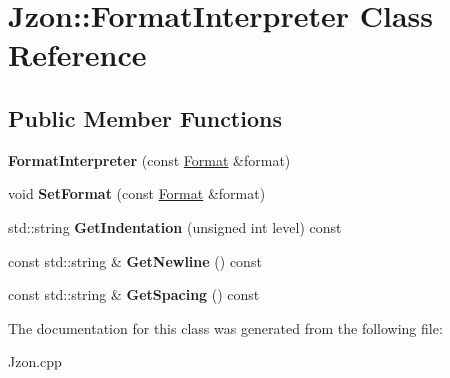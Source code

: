 \hypertarget{class_jzon_1_1_format_interpreter}{\section{Jzon\-:\-:Format\-Interpreter Class Reference}
\label{class_jzon_1_1_format_interpreter}
}
\subsection*{Public Member Functions}
\begin{DoxyCompactItemize}
\item 
\hypertarget{class_jzon_1_1_format_interpreter_a7464cb390be4ee67f45e9be26ef7ba08}{{\bfseries Format\-Interpreter} (const \hyperlink{struct_jzon_1_1_format}{Format} \&format)}\label{class_jzon_1_1_format_interpreter_a7464cb390be4ee67f45e9be26ef7ba08}

\item 
\hypertarget{class_jzon_1_1_format_interpreter_aa469372866b6e91ce2607e8bc4aea254}{void {\bfseries Set\-Format} (const \hyperlink{struct_jzon_1_1_format}{Format} \&format)}\label{class_jzon_1_1_format_interpreter_aa469372866b6e91ce2607e8bc4aea254}

\item 
\hypertarget{class_jzon_1_1_format_interpreter_a9d24644b25541b617ef5211a67d4cfc3}{std\-::string {\bfseries Get\-Indentation} (unsigned int level) const }\label{class_jzon_1_1_format_interpreter_a9d24644b25541b617ef5211a67d4cfc3}

\item 
\hypertarget{class_jzon_1_1_format_interpreter_adba21552b10df55483ae9f00704a5152}{const std\-::string \& {\bfseries Get\-Newline} () const }\label{class_jzon_1_1_format_interpreter_adba21552b10df55483ae9f00704a5152}

\item 
\hypertarget{class_jzon_1_1_format_interpreter_a8468ca011e3ad26ca9bce64542834697}{const std\-::string \& {\bfseries Get\-Spacing} () const }\label{class_jzon_1_1_format_interpreter_a8468ca011e3ad26ca9bce64542834697}

\end{DoxyCompactItemize}


The documentation for this class was generated from the following file\-:\begin{DoxyCompactItemize}
\item 
Jzon.\-cpp\end{DoxyCompactItemize}
